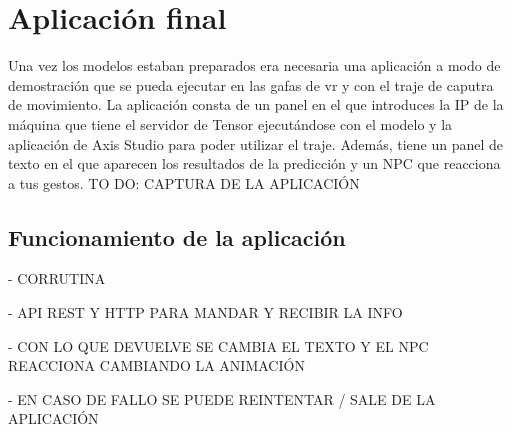 \section{Aplicación final}
\label{sec:aplicacionFinal}
Una vez los modelos estaban preparados era necesaria una aplicación a modo de demostración que se pueda ejecutar en las gafas de \gls{vr} y con el traje de caputra de movimiento.
La aplicación consta de un panel en el que introduces la IP de la máquina que tiene el servidor de Tensor ejecutándose con el modelo y la aplicación de Axis Studio para poder utilizar el traje.
Además, tiene un panel de texto en el que aparecen los resultados de la predicción y un NPC que reacciona a tus gestos.
TO DO: CAPTURA DE LA APLICACIÓN
\subsection{Funcionamiento de la aplicación}
- CORRUTINA

- API REST Y HTTP PARA MANDAR Y RECIBIR LA INFO

- CON LO QUE DEVUELVE SE CAMBIA EL TEXTO Y EL NPC REACCIONA CAMBIANDO LA ANIMACIÓN

- EN CASO DE FALLO SE PUEDE REINTENTAR / SALE DE LA APLICACIÓN